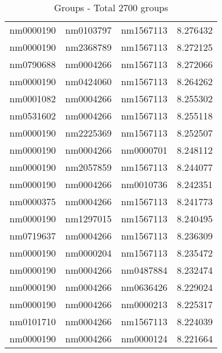 \begin{table}[H]
\begin{tabular}{ |c|c|c|c| }
            nm0000190 & nm0103797 & nm1567113 & 8.276432 \\
            nm0000190 & nm2368789 & nm1567113 & 8.272125 \\
            nm0790688 & nm0004266 & nm1567113 & 8.272066 \\
            nm0000190 & nm0424060 & nm1567113 & 8.264262 \\
            nm0001082 & nm0004266 & nm1567113 & 8.255302 \\
            nm0531602 & nm0004266 & nm1567113 & 8.255118 \\
            nm0000190 & nm2225369 & nm1567113 & 8.252507 \\
            nm0000190 & nm0004266 & nm0000701 & 8.248112 \\
            nm0000190 & nm2057859 & nm1567113 & 8.244077 \\
            nm0000190 & nm0004266 & nm0010736 & 8.242351 \\
            nm0000375 & nm0004266 & nm1567113 & 8.241773 \\
            nm0000190 & nm1297015 & nm1567113 & 8.240495 \\
            nm0719637 & nm0004266 & nm1567113 & 8.236309 \\
            nm0000190 & nm0000204 & nm1567113 & 8.235472 \\
            nm0000190 & nm0004266 & nm0487884 & 8.232474 \\
            nm0000190 & nm0004266 & nm0636426 & 8.229024 \\
            nm0000190 & nm0004266 & nm0000213 & 8.225317 \\
            nm0101710 & nm0004266 & nm1567113 & 8.224039 \\
            nm0000190 & nm0004266 & nm0000124 & 8.221664 \\
            \hline
        \end{tabular}
    \caption{Groups - Total 2700 groups}
\end{table}

